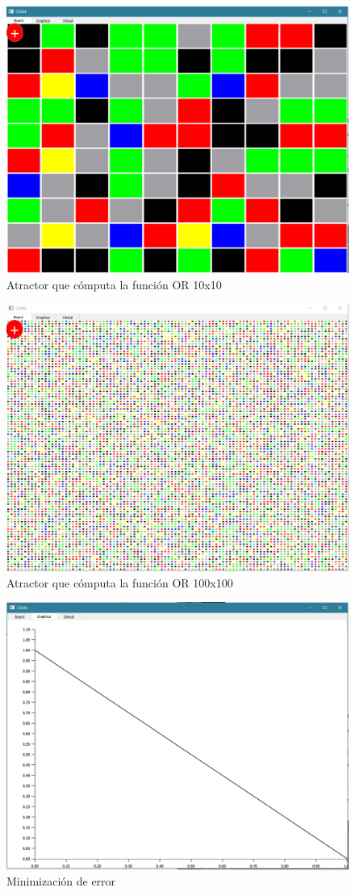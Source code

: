 \documentclass[]{article}
\begin{document}
\begin{figure}
\centering
\includegraphics[width=0.7\linewidth]{ore_1010}
\caption{Atractor que cómputa la función OR 10x10}
\label{fig:ore_1010}
\end{figure}

\begin{figure}
\centering
\includegraphics[width=0.7\linewidth]{ore100100}
\caption{Atractor que cómputa la función OR 100x100}
\label{fig:ore100100}
\end{figure}


\begin{figure}
\centering
\includegraphics[width=0.7\linewidth]{ore_error}
\caption{Minimización de error}
\label{fig:ore_error}
\end{figure}
\end{document}
